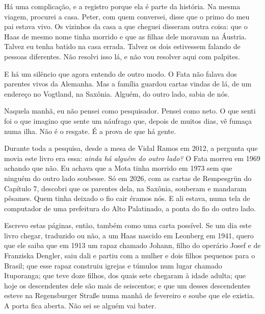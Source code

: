 \documentclass[
  brazilian,
  11pt,
  openany]{book}
\begin{document}
Há uma complicação, e a registro porque ela é parte da história. Na
mesma viagem, procurei a casa. Peter, com quem conversei, disse que o
primo do meu pai estava vivo. Os vizinhos da casa a que cheguei disseram
outra coisa: que o Haas de mesmo nome tinha morrido e que as filhas dele
moravam na Áustria. Talvez eu tenha batido na casa errada. Talvez os
dois estivessem falando de pessoas diferentes. Não resolvi isso lá, e
não vou resolver aqui com palpites.

E há um silêncio que agora entendo de outro modo. O Fata não falava dos
parentes vivos da Alemanha. Mas a família guardou cartas vindas de lá,
de um endereço no Vogtland, na Saxônia. Alguém, do outro lado, sabia de
nós.

Naquela manhã, eu não pensei como pesquisador. Pensei como neto. O que
senti foi o que imagino que sente um náufrago que, depois de muitos
dias, vê fumaça numa ilha. Não é o resgate. É a prova de que há gente.

Durante toda a pesquisa, desde a mesa de Vidal Ramos em 2012, a pergunta
que movia este livro era essa: \emph{ainda há alguém do outro lado?} O
Fata morreu em 1969 achando que não. Eu achava que a Mota tinha morrido
em 1973 sem que ninguém do outro lado soubesse. Só em 2026, com as
cartas de Rempesgrün do Capítulo 7, descobri que os parentes dela, na
Saxônia, souberam e mandaram pêsames. Quem tinha deixado o fio cair
éramos nós. E ali estava, numa tela de computador de uma prefeitura do
Alto Palatinado, a ponta do fio do outro lado.

Escrevo estas páginas, então, também como uma carta possível. Se um dia
este livro chegar, traduzido ou não, a um Haas nascido em Leonberg em
1941, quero que ele saiba que em 1913 um rapaz chamado Johann, filho do
operário Josef e de Franziska Dengler, saiu dali e partiu com a mulher e
dois filhos pequenos para o Brasil; que esse rapaz construiu igrejas e
túmulos num lugar chamado Ituporanga; que teve doze filhos, dos quais
sete chegaram à idade adulta; que hoje os descendentes dele são mais de
seiscentos; e que um desses descendentes esteve na Regensburger Straße
numa manhã de fevereiro e soube que ele existia. A porta fica aberta.
Não sei se alguém vai bater.
\end{document}
